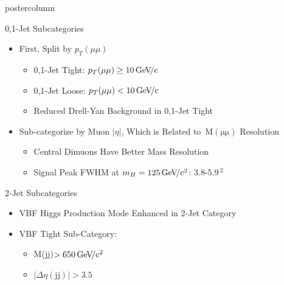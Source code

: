 \documentclass[final,hyperref={pdfpagelabels=false}]{beamer}
\newcommand{\mmm}{\ensuremath{\,\mathrm{M(\mu\mu)}}}
\newcommand{\pt}{\ensuremath{p_T}}
\newcommand{\ptmm}{\ensuremath{\pt(\mu\mu)}}
\newcommand{\GeVc}{\,\text{Ge\kern -0.1em V\!/c}}
\newcommand{\GeVcc}{\,\text{Ge\kern -0.1em  V\!/c}\ensuremath{\mathrm{^2}}}
\begin{document}
\begin{frame}
\begin{columns}
\begin{column}{.49\textwidth}
\begin{beamercolorbox}[center,wd=\textwidth]{postercolumn}
\begin{minipage}[T]{.95\textwidth}
{\begin{block}{0,1-Jet Subcategories}
\begin{itemize}
                \item First, Split by \ptmm{}
                \begin{itemize}
                  \item 0,1-Jet Tight: $\ptmm{}\geq10\GeVc{}$
                  \item 0,1-Jet Loose: $\ptmm{}<10\GeVc{}$
                  \item Reduced Drell-Yan Background in 0,1-Jet Tight
                \end{itemize}
                \item Sub-categorize by Muon $|\eta|$, Which is Related to \mmm{} Resolution
                \begin{itemize}
                  \item Central Dimuons Have Better Mass Resolution
                  \item Signal Peak FWHM at $m_H=125\GeVcc{}$: 3.8-5.9\GeVcc{} 
                \end{itemize}
              \end{itemize}
            \end{block}
            \vfill
            \begin{block}{2-Jet Subcategories}
              \begin{itemize}
                \item VBF Higgs Production Mode Enhanced in 2-Jet Category
                \item VBF Tight Sub-Category: 
                \begin{itemize}
                  \item M(jj)$>650\GeVcc{}$ 
                  \item $|\Delta\eta(\mathrm{jj})|>3.5$

\end{itemize}
\end{itemize}
\end{block}}
\end{minipage}
\end{beamercolorbox}
\end{column}
\end{columns}
\end{frame}
\end{document}
